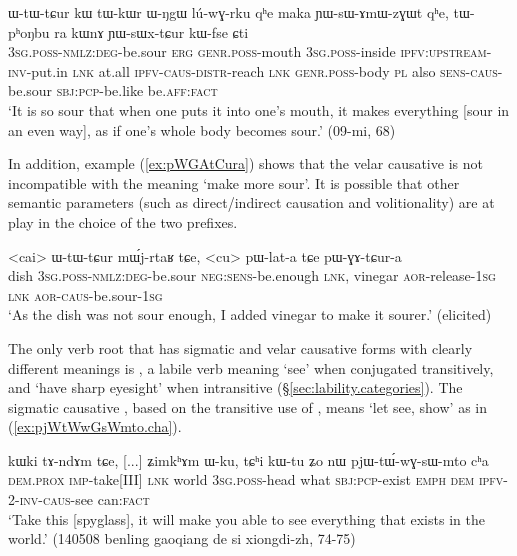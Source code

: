  \begin{exe}
\ex \label{ex:YWsWxtCur}
\gll ɯ-tɯ-tɕur kɯ tɯ-kɯr ɯ-ŋgɯ lú-wɣ-rku qʰe maka ɲɯ-sɯ-ɤmɯ-zɣɯt qʰe, tɯ-pʰoŋbu ra kɯnɤ ɲɯ-sɯx-tɕur kɯ-fse ɕti\\
\textsc{3sg}.\textsc{poss}-\textsc{nmlz}:\textsc{deg}-be.sour \textsc{erg} \textsc{genr}.\textsc{poss}-mouth \textsc{3sg}.\textsc{poss}-inside \textsc{ipfv}:\textsc{upstream}-\textsc{inv}-put.in \textsc{lnk} at.all  \textsc{ipfv}-\textsc{caus}-\textsc{distr}-reach \textsc{lnk} \textsc{genr}.\textsc{poss}-body \textsc{pl} also \textsc{sens}-\textsc{caus}-be.sour \textsc{sbj}:\textsc{pcp}-be.like be.\textsc{aff}:\textsc{fact}\\
\glt `It is so sour that when one puts it into one's mouth, it makes everything [sour in an even way], as if one's whole body becomes sour.' (09-mi, 68)
\end{exe}

In addition, example (\ref{ex:pWGAtCura}) shows that the velar causative   is not incompatible with the meaning `make more sour'. It is possible that other semantic parameters (such as direct/indirect causation and volitionality) are at play in the choice of the two prefixes.

 \begin{exe}
\ex \label{ex:pWGAtCura}
\gll  <cai> ɯ-tɯ-tɕur mɯ́j-rtaʁ tɕe, <cu> pɯ-lat-a tɕe pɯ-ɣɤ-tɕur-a \\
dish \textsc{3sg}.\textsc{poss}-\textsc{nmlz}:\textsc{deg}-be.sour \textsc{neg}:\textsc{sens}-be.enough \textsc{lnk}, vinegar \textsc{aor}-release-\textsc{1sg} \textsc{lnk} \textsc{aor}-\textsc{caus}-be.sour-\textsc{1sg} \\
\glt `As the dish was not sour enough, I added vinegar to make it sourer.' (elicited)
\end{exe}

The only verb root that has sigmatic and velar causative forms with clearly different meanings is , a labile verb meaning `see' when conjugated transitively, and `have sharp eyesight' when intransitive (§\ref{sec:lability.categories}). The sigmatic causative , based on the transitive use of , means `let see, show' as in (\ref{ex:pjWtWwGsWmto.cha}).


\begin{exe}
\ex \label{ex:pjWtWwGsWmto.cha}
\gll  kɯki tɤ-ndɤm tɕe, [...] ʑimkʰɤm ɯ-ku, tɕʰi kɯ-tu ʑo nɯ pjɯ-tɯ́-wɣ-sɯ-mto cʰa \\
\textsc{dem}.\textsc{prox} \textsc{imp}-take[III] \textsc{lnk} { } world \textsc{3sg}.\textsc{poss}-head what \textsc{sbj}:\textsc{pcp}-exist \textsc{emph} \textsc{dem} \textsc{ipfv}-2-\textsc{inv}-\textsc{caus}-see can:\textsc{fact} \\
\glt `Take this [spyglass], it will make you able to see everything that exists in the world.' (140508 benling gaoqiang de si xiongdi-zh, 74-75)
\end{exe} 

